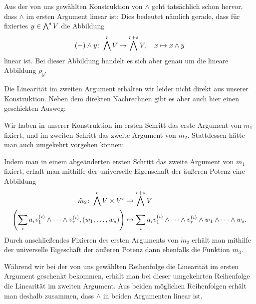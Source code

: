 \begin{remark}
  Aus der von uns gewählten Konstruktion von $\wedge$ geht tatsächlich schon hervor, dass $\wedge$ im ersten Argument linear ist:
  Dies bedeutet nämlich gerade, dass für fixiertes $y \in \bigwedge^{s} V$ die Abbildung
  \[
            (-) \wedge y
    \colon  \bigwedge^{r} V
    \to     \bigwedge^{r+s} V,
    \quad   x
    \mapsto x \wedge y
  \]
  linear ist.
  Bei dieser Abbildung handelt es sich aber genau um die lineare Abbildung $\rho_y$.
  
  Die Linearität im zweiten Argument erhalten wir leider nicht direkt aus unserer Konstruktion.
  Neben dem direkten Nachrechnen gibt es aber auch hier einen geschickten Ausweg:
  
  Wir haben in unserer Konstruktion im ersten Schritt das erste Argument von $m_1$ fixiert, und im zweiten Schritt das zweite Argument von $m_2$.
  Stattdessen hätte man auch umgekehrt vorgehen können:
  
  Indem man in einem abgeänderten ersten Schritt das zweite Argument von $m_1$ fixiert, erhalt man mithilfe der universelle Eigenschaft der äußeren Potenz eine Abbildung
  \begin{align*}
            \tilde{m}_2
     \colon \bigwedge^{r} V \times V^s
    &\to    \bigwedge^{r+s} V
    \\
              \left( \sum_i a_i v_1^{(i)} \wedge \dotsb \wedge v_r^{(i)}, (w_1, \dotsc, w_s) \right)
    &\mapsto  \sum_i a_i v^{(i)}_1 \wedge \dotsb \wedge v^{(i)}_r \wedge w_1 \wedge \dotsb \wedge w_s.
  \end{align*}
  Durch anschließendes Fixieren des ersten Arguments von $\tilde{m}_2$ erhält man mithilfe der universelle Eigeschaft der äußeren Potenz dann ebenfalls die Funktion $m_3$.
  
  Während wir bei der von uns gewählten Reihenfolge die Linearität im ersten Argument geschenkt bekommen, erhält man bei dieser umgekehrten Reihenfolge die Linearität im zweiten Argument.
  Aus beiden möglichen Reihenfolgen erhält man deshalb zusammen, dass $\wedge$ in beiden Argumenten linear ist.
\end{remark}

